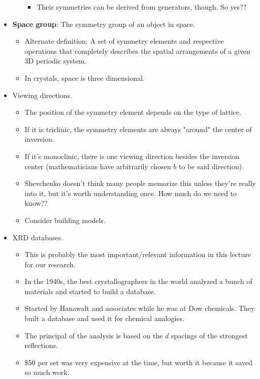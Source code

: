 \documentclass[../notes.tex]{subfiles}
\begin{document}
\begin{itemize}
\begin{itemize}
\begin{itemize}
            \item Their symmetries can be derived from generators, though. So yes??
        \end{itemize}
    \end{itemize}
    \item \textbf{Space group}: The symmetry group of an object in space.
    \begin{itemize}
        \item Alternate definition: A set of symmetry elements and respective operations that completely describes the spatial arrangements of a given 3D periodic system.
        \item In crystals, space is three dimensional.
    \end{itemize}
    \item Viewing directions.
    \begin{itemize}
        \item The position of the symmetry element depends on the type of lattice.
        \item If it is triclinic, the symmetry elements are always "around" the center of inversion.
        \item If it's monoclinic, there is one viewing direction besides the inversion center (mathematicians have arbitrarily chosen $b$ to be said direction).
        \item Shevchenko doesn't think many people memorize this unless they're really into it, but it's worth understanding once. How much do we need to know??
        \item Consider building models.
    \end{itemize}
    \item XRD databases.
    \begin{itemize}
        \item This is probably the most important/relevant information in this lecture for our research.
        \item In the 1940s, the best crystallographers in the world analyzed a bunch of materials and started to build a database.
        \item Started by Hanawalt and associates while he was at Dow chemicals. They built a database and used it for chemical analogies.
        \item The principal of the analysis is based on the $d$ spacings of the strongest reflections.
        \item \$50 per set was very expensive at the time, but worth it because it saved so much work.

\end{itemize}
\end{itemize}
\end{document}
